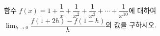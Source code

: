 함수 $f(x)=1+\dfrac{1}{x}+\dfrac{1}{x^2}+\dfrac{1}{x^3}+\cdots+\dfrac{1}{x^{10}}$에 대하여 $\displaystyle\lim_{h\to 0}\dfrac{f(1+2h)-f(1-h)}{h}$의 값을 구하시오.
